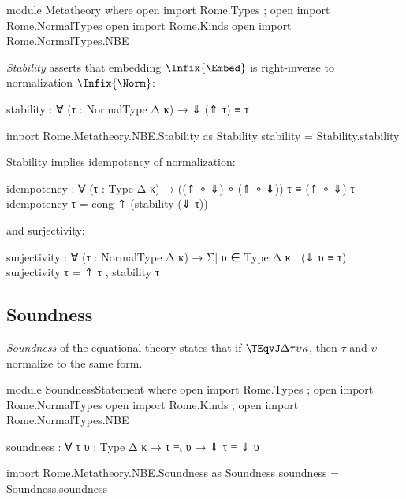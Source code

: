 \begin{AgdaAlign}
\begin{code}[hide]
module Metatheory where
  open import Rome.Types ; open import Rome.NormalTypes
  open import Rome.Kinds
  open import Rome.NormalTypes.NBE
\end{code}
\emph{Stability} asserts that embedding $\Infix{\Embed}$ is right-inverse to normalization $\Infix{\Norm}$:

\begin{code}
  stability : ∀ (τ : NormalType Δ κ) → ⇓ (⇑ τ) ≡ τ 
\end{code}
\begin{code}[hide]
  import Rome.Metatheory.NBE.Stability as Stability
  stability = Stability.stability
\end{code}

\Ni Stability implies idempotency of normalization:
\begin{code}
  idempotency : ∀ (τ : Type Δ κ) → 
                ((⇑ ∘ ⇓) ∘ (⇑ ∘ ⇓)) τ ≡ (⇑ ∘ ⇓) τ 
  idempotency τ = cong ⇑ (stability (⇓ τ)) 
\end{code} 

\Ni and surjectivity:

\begin{code}
  surjectivity : ∀ (τ : NormalType Δ κ) → 
                 Σ[ υ ∈ Type Δ κ ] (⇓ υ ≡ τ)
  surjectivity τ = ⇑ τ , stability τ
\end{code}
\end{AgdaAlign}

\subsection{Soundness}
\label{sec:soundness} 
\emph{Soundness} of the equational theory states that if $\TEqvJ \Delta \tau \upsilon \kappa$, then $\tau$ and $\upsilon$ normalize to the same form.
\begin{AgdaAlign}
\begin{code}[hide]
module SoundnessStatement where
  open import Rome.Types ; open import Rome.NormalTypes
  open import Rome.Kinds ; open import Rome.NormalTypes.NBE
\end{code} 
\begin{code}
  soundness : ∀ {τ υ : Type Δ κ} → τ ≡ₜ υ → ⇓ τ ≡ ⇓ υ
\end{code}
\begin{code}[hide]
  import Rome.Metatheory.NBE.Soundness as Soundness
  soundness = Soundness.soundness
\end{code}
\end{AgdaAlign}


